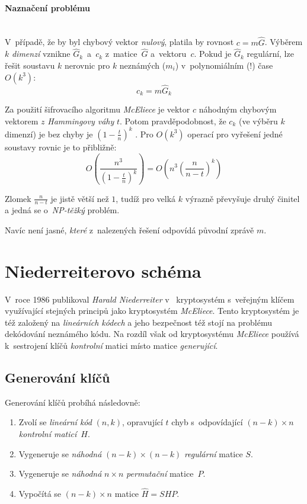 \documentclass[thesis=M,czech,hidelinks]{FITthesis}[2012/06/26]
\newcommand{\0}{{\textcolor[gray]{0.80}{0}}}
\begin{document}
\paragraph{Naznačení problému} \hfil \\

V~případě, že by byl chybový vektor \emph{nulový}, platila by rovnost
$c = m\hat{G}$. Výběrem $k$ \emph{dimenzí} vznikne $\hat{G}_k$~a~$c_k$
z~matice~$\hat{G}$ a~vektoru~$c$. Pokud je $\hat{G}_k$ regulární, lze řešit
soustavu $k$ nerovnic pro $k$ neznámých ($m_i$) v~polynomiálním (!) čase
$O\left(k^3\right)$:
$$c_k = m \hat{G}_k$$

Za použití šifrovacího algoritmu \emph{McEliece} je vektor $c$ 
náhodným chybovým vektorem $z$ \emph{Hammingovy váhy} $t$. Potom
pravděpodobnost, že $c_k$ (ve výběru $k$ dimenzí) je bez chyby je
$\left(1-\frac{t}{n}\right)^k$ \cite{McEliece}. Pro $O\left(k^3\right)$ operací
pro vyřešení jedné soustavy rovnic je to přibližně:
$$ O\left( \frac{n^3}{\left(1-\frac{t}{n}\right)^k} \right) =
O\left( n^3 \left(\frac{n}{n-t}\right)^k \right)$$

Zlomek $\frac{n}{n-t}$ je jistě větší než $1$, tudíž pro velká $k$ výrazně
převyšuje druhý činitel a jedná se o~\emph{NP-těžký} problém.

Navíc není jasné, \emph{které} z~nalezených řešení odpovídá původní zprávě $m$.

\section{Niederreiterovo schéma}
V~roce 1986 publikoval \emph{Harald Niederreiter} v~\cite{Niederreiter}
kryptosystém s~veřejným klíčem využívající stejných principů jako kryptosystém
\emph{McEliece}. Tento kryptosystém je též založený na \emph{lineárních kódech}
a jeho bezpečnost též stojí na problému dekódování neznámého kódu. Na rozdíl
však od kryptosystému \emph{McEliece} používá k~sestrojení klíčů
\emph{kontrolní} matici místo matice \emph{generující}.

\subsection{Generování klíčů}
Generování klíčů probíhá následovně:
\begin{enumerate}
    \item Zvolí se \emph{lineární kód} $(n,k)$, opravující $t$ chyb
        s~odpovídající $(n-k) \times n$ \emph{kontrolní maticí}~$H$.
    \item Vygeneruje se \emph{náhodná} $(n-k) \times (n-k)$ \emph{regulární}
        matice $S$.
    \item Vygeneruje se \emph{náhodná} $n \times n$ \emph{permutační}
        matice~$P$.
    \item Vypočítá se $(n-k) \times n$ matice $\hat{H} = S H P$.
\end{enumerate}
\end{document}
